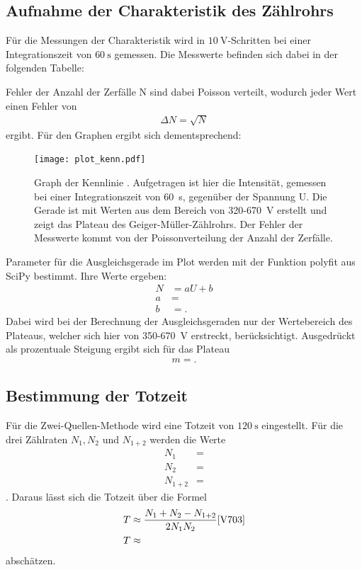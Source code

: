 \subsection{Aufnahme der Charakteristik des Zählrohrs}
Für die Messungen der Charakteristik wird in $\SI{10}{\volt} $-Schritten bei einer 
Integrationszeit von $\SI{60}{\second} $ gemessen.
Die Messwerte befinden sich dabei in der folgenden Tabelle:

\justifying Fehler der Anzahl der Zerfälle N sind dabei Poisson verteilt, wodurch jeder Wert 
einen Fehler von
\begin{align}
    \Delta N = \sqrt{N} \label{eq:1}
\end{align}
ergibt.
Für den Graphen ergibt sich dementsprechend:
\begin{figure}[H]
    \centering
    \texttt{[image: plot\_kenn.pdf]}
    \caption{Graph der Kennlinie \cite{matplotlib}.
    Aufgetragen ist hier die Intensität, gemessen bei einer Integrationszeit
    von \SI{60}{\second}, gegenüber der Spannung U. Die Gerade ist mit Werten aus dem Bereich
    von 320-\SI{670}{\volt} erstellt und zeigt das Plateau des Geiger-Müller-Zählrohrs.
    Der Fehler der Messwerte kommt von der Poissonverteilung der Anzahl der Zerfälle.
    }
    \label{fig:7}
\end{figure}

\justifying Parameter für die Ausgleichsgerade im Plot werden mit der Funktion polyfit aus SciPy \cite{scipy}
bestimmt. Ihre Werte ergeben:
\begin{align}
    N &= aU+b\label{eq:2} \\
    a&= \text{} \label{eq:3} \\
    b&= \text{} \label{eq:4}.
\end{align}
Dabei wird bei der Berechnung der Ausgleichsgeraden nur der Wertebereich des
Plateaus, welcher sich hier von 350-\SI{670}{\volt} erstreckt, berücksichtigt.
Ausgedrückt als prozentuale Steigung ergibt sich für das Plateau
\begin{align}
m = \text{}.
\end{align}

\subsection{Bestimmung der Totzeit}

Für die Zwei-Quellen-Methode wird eine Totzeit von $\SI{120}{\second} $ eingestellt.
Für die drei Zählraten $N_1, N_2$ und $N_{1+2} $ werden die Werte
\begin{align}
    N_1&= \text{} \label{eq:5} \\
    N_2&= \text{} \label{eq:6} \\
    N_{1+2}&= \text{} \label{eq:7} 
\end{align}
\justifying.
Daraus lässt sich die Totzeit über die Formel 
\begin{align}
    T &\approx \frac{N_1+N_2-N_{1+2}}{2N_1 N_2} \label{eq:8} \text{\cite{V703}} \\
    T &\approx \text{} \label{eq:9}
\end{align}
abschätzen.

